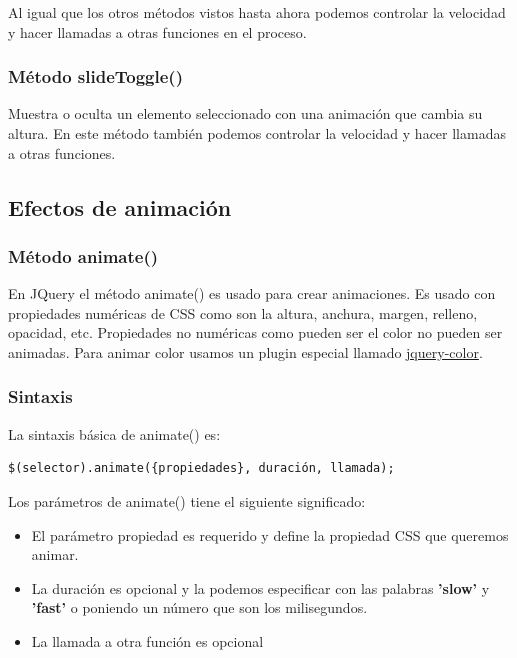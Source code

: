 \documentclass[11pt]{article}
\begin{document}
Al igual que los otros métodos vistos hasta ahora podemos controlar la velocidad y hacer llamadas a otras funciones en el proceso.

\subsubsection*{Método slideToggle()}
\label{sec:orgfe36ea8}

Muestra o oculta un elemento seleccionado con una animación que cambia su altura. En este método también podemos  controlar la velocidad y hacer llamadas a otras funciones.

\subsection*{Efectos de animación}
\label{sec:org114cfdb}

\subsubsection*{Método animate()}
\label{sec:org2e49227}

En JQuery el método animate() es usado para crear animaciones. Es usado con propiedades numéricas de CSS como son la altura, anchura, margen, relleno, opacidad, etc. Propiedades no numéricas como pueden ser el color no pueden ser animadas. Para animar color usamos un plugin especial llamado \href{https://github.com/jquery/jquery-color}{jquery-color}.

\subsubsection*{Sintaxis}
\label{sec:org2cfa061}

La sintaxis básica de animate() es:

\begin{verbatim}
$(selector).animate({propiedades}, duración, llamada);
\end{verbatim}

Los parámetros de animate() tiene el siguiente significado:

\begin{itemize}
\item El parámetro propiedad es requerido y define la propiedad CSS que queremos animar.
\item La duración es opcional y la podemos especificar con las palabras \textbf{'slow'} y \textbf{'fast'} o poniendo un número que son los milisegundos.
\item La llamada a otra función es opcional
\end{itemize}
\end{document}
